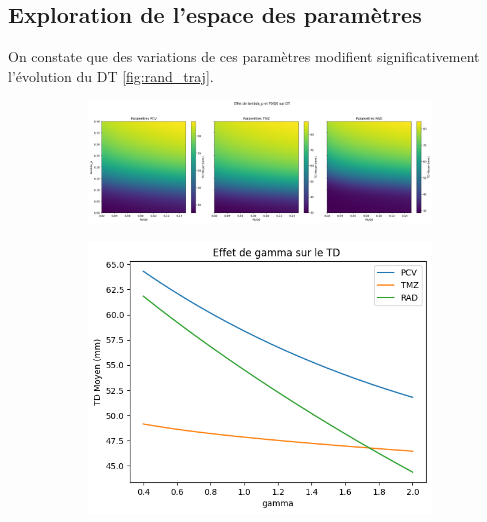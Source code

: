 \documentclass[12pt]{article}
\begin{document}
\subsection{Exploration de l'espace des paramètres}
On constate que des variations de ces paramètres modifient significativement l'évolution du DT \ref{fig:rand_traj}.  

\begin{figure}
    
    \begin{subfigure}[t]{\textwidth}
    \centering
        \includegraphics[width=\linewidth]{Image/heatmap_lambdap_p0Q0.png} 
        \caption{} \label{fig:heatmap}
    \end{subfigure}
    \vspace{1cm}
    \centering
    \begin{subfigure}[t]{0.45\textwidth}
        \centering
        \includegraphics[width=\linewidth]{Image/effet_gamma.png} 
        \caption{} \label{fig:effet_gamma}
    \end{subfigure}
    \hfill
    \begin{subfigure}[t]{0.45\textwidth}

\end{subfigure}
\end{figure}
\end{document}

